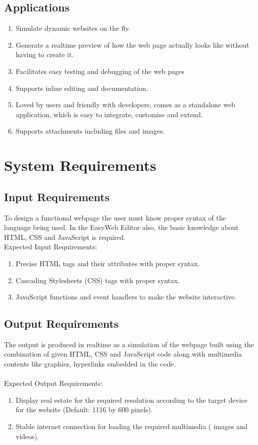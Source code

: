\documentclass[12pt,a4paper]{article}
\begin{document}
\subsection{Applications}
\begin{enumerate}
\item Simulate dynamic websites on the fly.
\item Generate a realtime preview of how the web page actually looks like without having to create it.
\item Facilitates easy testing and debugging of the web pages
\item Supports inline editing and documentation.
\item Loved by users and friendly with developers, comes as a standalone web application, which is easy to integrate, customise and extend.
\item Supports attachments including files and images.
\end{enumerate}
\newpage

\section{System Requirements}
\subsection{Input Requirements}
To design a functional webpage the user must know proper syntax of the language being used. In the EasyWeb Editor also, the basic knowledge about HTML, CSS and JavaScript is required.\\
Expected Input Requirements:
\begin{enumerate}
\item Precise HTML tags and their attributes with proper syntax.
\item Cascading Stylesheets (CSS) tags with proper syntax.
\item JavaScript functions and event handlers to make the website interactive.
\end{enumerate}

\subsection{Output Requirements}
The output is produced in realtime as a simulation of the webpage built using the combination of given HTML, CSS and JavaScript code along with multimedia contents like graphics, hyperlinks embedded in the code.\\
\\
Expected Output Requirements:
\begin{enumerate}
\item Display real estate for the required resolution according to the target device for the website (Default: 1116 by 600 pixels).
\item Stable internet connection for loading the required multimedia ( images and videos).
\end{enumerate}
\end{document}
